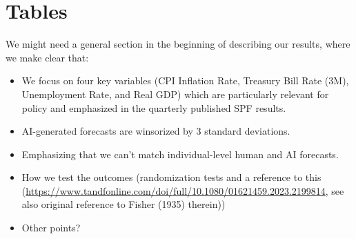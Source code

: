 \documentclass{article}
\begin{document}
\section*{Tables}
We might need a general section in the beginning of describing our results, where we make clear that:
\begin{itemize}
    \item We focus on four key variables (CPI Inflation Rate, Treasury Bill Rate (3M), Unemployment Rate, and Real GDP) which are particularly relevant for policy and emphasized in the quarterly published SPF results.
    \item AI-generated forecasts are winsorized by 3 standard deviations. 
    \item Emphasizing that we can't match individual-level human and AI forecasts.
    \item How we test the outcomes (randomization tests and a reference to this (\url{https://www.tandfonline.com/doi/full/10.1080/01621459.2023.2199814}, see also original reference to Fisher (1935) therein))
    \item Other points?
\end{itemize}
\end{document}

